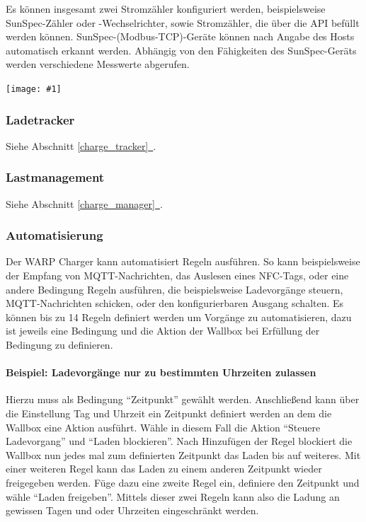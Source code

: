 \documentclass[a4paper,10pt]{article}
\newcommand{\gfx}[1]{\texttt{[image: \#1]}}
\newcommand*{\fullref}[1]{Abschnitt \hyperref[{#1}]{\ref*{#1}~\nameref*{#1}}}
\begin{document}
\begin{multicols*}{2}
    Es können insgesamt zwei Stromzähler konfiguriert werden, beispielsweise SunSpec-Zähler oder -Wechselrichter,
    sowie Stromzähler, die über die API befüllt werden können. SunSpec-(Modbus-TCP)-Geräte können nach Angabe des Hosts
    automatisch erkannt werden. Abhängig von den Fähigkeiten des SunSpec-Geräts werden verschiedene Messwerte abgerufen.

    \gfx{./img_warp2/resized/web_meter}

    \vspace{-0.4cm}
    \subsubsection{Ladetracker}
    Siehe \fullref{charge_tracker}.
    \vspace{-0.2cm}
    \subsubsection{Lastmanagement}
    Siehe \fullref{charge_manager}.
     \vspace{-0.2cm}
    \subsubsection{Automatisierung}
    Der WARP Charger kann automatisiert Regeln ausführen. So kann beispielsweise
    der Empfang von MQTT-Nachrichten, das Auslesen eines NFC-Tags, oder eine andere Bedingung
    Regeln ausführen, die beispielsweise Ladevorgänge steuern, MQTT-Nachrichten schicken, oder
    den konfigurierbaren Ausgang schalten.
    Es können bis zu 14 Regeln definiert werden um Vorgänge zu automatisieren,
    dazu ist jeweils eine Bedingung und die Aktion der Wallbox bei Erfüllung der
    Bedingung zu definieren.

    \paragraph{Beispiel: Ladevorgänge nur zu bestimmten Uhrzeiten zulassen}
    Hierzu muss als Bedingung \enquote{Zeitpunkt} gewählt werden. Anschließend
    kann über die Einstellung Tag und Uhrzeit ein Zeitpunkt definiert werden an
    dem die Wallbox eine Aktion ausführt. Wähle in diesem Fall die Aktion
    \enquote{Steuere Ladevorgang} und \enquote{Laden blockieren}. Nach
    Hinzufügen der Regel blockiert die Wallbox nun jedes mal zum definierten
    Zeitpunkt das Laden bis auf weiteres. Mit einer weiteren Regel kann
    das Laden zu einem anderen Zeitpunkt wieder freigegeben werden. Füge dazu
    eine zweite Regel ein, definiere den Zeitpunkt und wähle
    \enquote{Laden freigeben}. Mittels dieser zwei Regeln kann also die Ladung
    an gewissen Tagen und oder Uhrzeiten eingeschränkt werden.


\end{multicols*}
\end{document}
